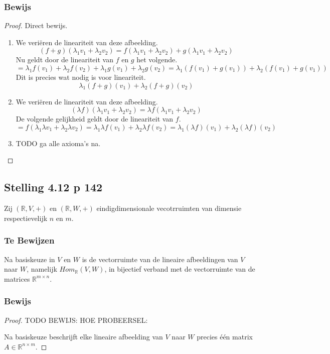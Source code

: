 \documentclass[lineaire_algebra_oplossingen.tex]{subfiles}
\begin{document}
\subsubsection*{Bewijs}
\begin{proof}
Direct bewijs.
\begin{enumerate}
\item
We veri\"eren de lineariteit van deze afbeelding.
\[
(f+g)(\lambda_1v_1+\lambda_2v_2) = f(\lambda_1v_1+\lambda_2v_2) + g(\lambda_1v_1+\lambda_2v_2)
\]
Nu geldt door de lineariteit van $f$ en $g$ het volgende.
\[
= \lambda_1f(v_1)+\lambda_2f(v_2) + \lambda_1g(v_1)+\lambda_2g(v_2) = \lambda_1(f(v_1)+g(v_1)) + \lambda_2(f(v_1)+g(v_1))
\]
Dit is precies wat nodig is voor lineariteit.
\[
\lambda_1(f+g)(v_1)+\lambda_2(f+g)(v_2)
\]
\item
We veri\"eren de lineariteit van deze afbeelding.
\[
(\lambda f)(\lambda_1v_1+\lambda_2v_2) = \lambda f(\lambda_1v_1+\lambda_2v_2)
\]
De volgende gelijkheid geldt door de lineariteit van $f$. 
\[
=  f(\lambda_1\lambda v_1+\lambda_2\lambda v_2) = \lambda_1\lambda f(v_1)+\lambda_2\lambda f(v_2) = 
\lambda_1(\lambda f)(v_1)+\lambda_2(\lambda f)(v_2)
\]
\item
TODO ga alle axioma's na.
\end{enumerate}
\end{proof}

\subsection{Stelling 4.12 p 142}
Zij $(\mathbb{R},V,+)$ en  $(\mathbb{R},W,+)$ eindigdimensionale vecotrruimten van dimensie respectievelijk $n$ en $m$.
\subsubsection*{Te Bewijzen}
Na basiskeuze in $V$ en $W$ is de vectorruimte van de lineaire afbeeldingen van $V$ naar $W$, namelijk $Hom_{\mathbb{R}}(V,W)$, in bijectief verband met de vectorruimte van de matrices $\mathbb{R}^{m\times n}$.
\subsubsection*{Bewijs}
\begin{proof}
TODO BEWIJS: HOE
PROBEERSEL:

Na basiskeuze beschrijft elke lineaire afbeelding van $V$ naar $W$ precies \'e\'en matrix $A\in \mathbb{R}^{n\times m}$.
\end{proof}
\end{document}
